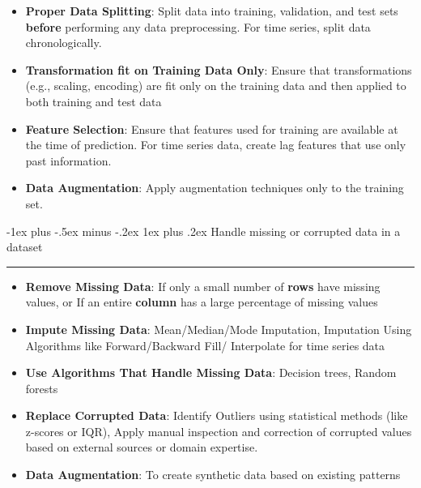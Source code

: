 \documentclass[letterpaper, 10.5pt,landscape]{article}
\makeatletter
\renewcommand{\subsubsection}{\@startsection{subsubsection}{3}{0mm}%
                                {-1ex plus -.5ex minus -.2ex}%
                                {1ex plus .2ex}%
                                {\normalfont\small\bfseries}}
\makeatother
\begin{document}
\begin{multicols*}{3}
\begin{itemize} [leftmargin=0.5cm]
    \item \textbf{Proper Data Splitting}: Split data into training, validation, and test sets \textbf{before} performing any data preprocessing. For time series, split data chronologically.
    \vspace{-3pt}
    \item \textbf{Transformation fit on Training Data Only}: Ensure that transformations (e.g., scaling, encoding) are fit only on the training data and then applied to both training and test data
    \item \textbf{Feature Selection}: Ensure that features used for training are available at the time of prediction. For time series data, create lag features that use only past information.
    \vspace{-3pt}
    \item \textbf{Data Augmentation}: Apply augmentation techniques only to the training set. 
\end{itemize}



\subsubsection{Handle missing or corrupted data in a dataset} {\color{teal}\hrule height 0.5pt} \smallskip

\begin{itemize} [leftmargin=0.5cm]
    \item \textbf{Remove Missing Data}: If only a small number of \textbf{rows} have missing values, or If an entire \textbf{column} has a large percentage of missing values
    \vspace{-3pt}
    \item \textbf{Impute Missing Data}: Mean/Median/Mode Imputation, Imputation Using Algorithms like Forward/Backward Fill/ Interpolate for time series data
    \item \textbf{Use Algorithms That Handle Missing Data}: Decision trees, Random forests
    \vspace{-3pt}
    \item \textbf{Replace Corrupted Data}: Identify Outliers using statistical methods (like z-scores or IQR), Apply manual inspection and correction of corrupted values based on external sources or domain expertise.
    \vspace{-3pt}
    \item \textbf{Data Augmentation}: To create synthetic data based on existing patterns
\end{itemize}




\end{multicols*}
\end{document}
